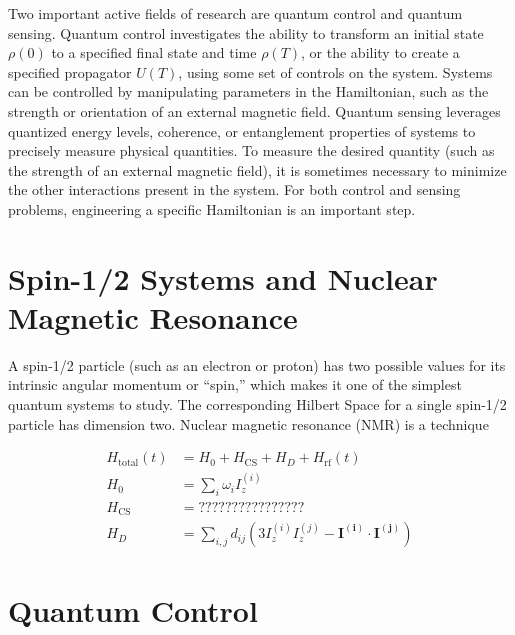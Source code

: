 \lipsum[1]

Two important active fields of research are quantum control and quantum sensing. Quantum control investigates the ability to transform an initial state $\rho(0)$ to a specified final state and time $\rho(T)$, or the ability to create a specified propagator $U(T)$, using some set of controls on the system.\cite{Dong_2010} Systems can be controlled by manipulating parameters in the Hamiltonian, such as the strength or orientation of an external magnetic field.
Quantum sensing leverages quantized energy levels, coherence, or entanglement properties of systems to precisely measure physical quantities. To measure the desired quantity (such as the strength of an external magnetic field), it is sometimes necessary to minimize the other interactions present in the system. For both control and sensing problems, engineering a specific Hamiltonian is an important step.

\section{Spin-1/2 Systems and Nuclear Magnetic Resonance}

A spin-1/2 particle (such as an electron or proton) has two possible values for its intrinsic angular momentum or ``spin,'' which makes it one of the simplest quantum systems to study. The corresponding Hilbert Space for a single spin-1/2 particle has dimension two.
Nuclear magnetic resonance (NMR) is a technique %

\begin{align}\label{eq:nmr-ham}
    H_\text{total}(t) &= H_0 + H_\text{CS} + H_D + H_\text{rf}(t) \\
    H_0 &= \sum_i \omega_i I_z^{(i)} \\
    H_\text{CS} &= ???????????????? \\
    H_D &= \sum_{i,j} d_{ij} \left( 3I_z^{(i)}I_z^{(j)} - \mathbf{I^{(i)}} \cdot \mathbf{I^{(j)}} \right)
\end{align}

\lipsum[2]

\section{Quantum Control}

\lipsum[1]


